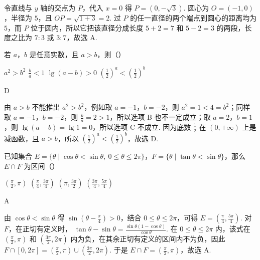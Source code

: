 \begin{solution}
令直线与 \(y\) 轴的交点为 \(P\)，代入 \(x=0\) 得 \(P=(0,-\sqrt{3})\). 圆心为 \(O=(-1,0)\)，半径为 \(5\)，且 \(OP=\sqrt{1+3}=2\). 过 \(P\) 的任一直径的两个端点到圆心的距离均为 \(5\)，而 \(P\) 位于圆内，所以它把该直径分成长度 \(5+2=7\) 和 \(5-2=3\) 的两段，长度之比为 \(7:3\) 或 \(3:7\)，故选 A.
\end{solution}

\begin{problem}
若 \(a\)，\(b\) 是任意实数，且 \(a > b\)，则（\quad）

\choices
    {\(a^2 > b^2\)}
    {\(\frac{b}{a} < 1\)}
    {\(\lg (a - b) > 0\)}
    {\(\left(\frac{1}{2}\right)^a < \left(\frac{1}{2}\right)^b\)}
\end{problem}

\begin{answer}
D
\end{answer}

\begin{solution}
由 \(a>b\) 不能推出 \(a^2>b^2\)，例如取 \(a=-1\)，\(b=-2\)，则 \(a^2=1<4=b^2\)；同样取 \(a=-1\)，\(b=-2\)，则 \(\frac{b}{a}=2>1\)，所以选项 B 也不一定成立；取 \(a=2\)，\(b=1\)，则 \(\lg(a-b)=\lg1=0\)，所以选项 C 不成立. 因为底数 \(\frac{1}{2}\) 在 \((0,+\infty)\) 上是减函数，且 \(a>b\)，所以 \(\left(\frac{1}{2}\right)^a<\left(\frac{1}{2}\right)^b\)，故选 D.
\end{solution}

\begin{problem}
已知集合 \(E = \{\theta \mid \cos \theta < \sin \theta,\ 0 \leqslant \theta \leqslant 2\pi\}\)，\(F = \{\theta \mid \tan \theta < \sin \theta\}\)，那么 \(E \cap F\) 为区间（\quad）

\choices
    {\(\left(\frac{\pi}{2},\pi\right)\)}
    {\(\left(\frac{\pi}{4},\frac{3\pi}{4}\right)\)}
    {\(\left(\pi, \frac{3\pi}{2}\right)\)}
    {\(\left(\frac{3\pi}{4}, \frac{5\pi}{4}\right)\)}
\end{problem}

\begin{answer}
A
\end{answer}

\begin{solution}
由 \(\cos\theta<\sin\theta\) 得 \(\sin\left(\theta-\frac{\pi}{4}\right)>0\)，结合 \(0\leqslant\theta\leqslant2\pi\)，可得 \(E=\left(\frac{\pi}{4},\frac{5\pi}{4}\right)\). 对 \(F\)，在正切有定义时，
\(\tan\theta-\sin\theta=\frac{\sin\theta(1-\cos\theta)}{\cos\theta}\). 在 \(0\leqslant\theta\leqslant2\pi\) 内，该式在 \(\left(\frac{\pi}{2},\pi\right)\) 和 \(\left(\frac{3\pi}{2},2\pi\right)\) 内为负，在其余正切有定义的区间内不为负，因此 \(F\cap[0,2\pi]=\left(\frac{\pi}{2},\pi\right)\cup\left(\frac{3\pi}{2},2\pi\right)\). 于是 \(E\cap F=\left(\frac{\pi}{2},\pi\right)\)，故选 A.
\end{solution}

